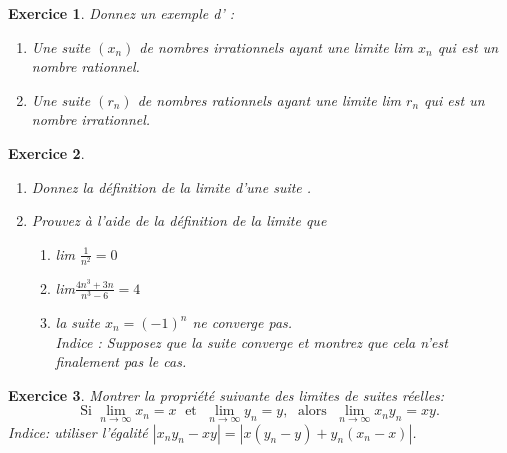 \documentclass[11pt,french,table]{article}
\theoremstyle{exercice}
\newtheorem{exercice}{Exercice}
\begin{document}
\vspace{1em}
\begin{exercice}
Donnez un exemple d' :
\begin{enumerate}
    \item [(a)] Une suite $(x_n)$ de nombres irrationnels ayant une limite lim $x_n$ qui est un nombre rationnel.
    \item[*(b)] Une suite $(r_n)$ de nombres rationnels ayant une limite lim $r_n$ qui est un nombre irrationnel. 
\end{enumerate}
\end{exercice}
\vspace{1em}
\begin{exercice}
\begin{enumerate}
    \item [(i)] Donnez la définition de la limite d'une suite .
    \item[(ii)] Prouvez à l'aide de la définition de la limite que 
\begin{enumerate}
    \item[(a)] lim $\frac{1}{n^2}=0$
    \item[*(b)] lim$\frac{4n^3+3n}{n^3-6}=4$
    \item[(c)] la suite $x_n=(-1)^n$ ne converge pas. \\ \textit{Indice : Supposez que la suite converge et montrez que cela n'est finalement pas le cas. }
\end{enumerate}
\end{enumerate}
\end{exercice}
\vspace{1em}
\begin{exercice}
 Montrer la propriété suivante des limites de suites réelles:
$$\text{Si } \lim_{n \to \infty} x_n = x \; \text{  et  } \; \lim_{n \to \infty} y_n = y, \; \text{  alors  } \; \lim_{n \to \infty} x_ny_n = xy.$$
\textit{Indice: utiliser l'égalité \; $| x_ny_n - xy| = |x(y_n - y) + y_n(x_n-x) |$.} \\
\end{exercice}
\end{document}
